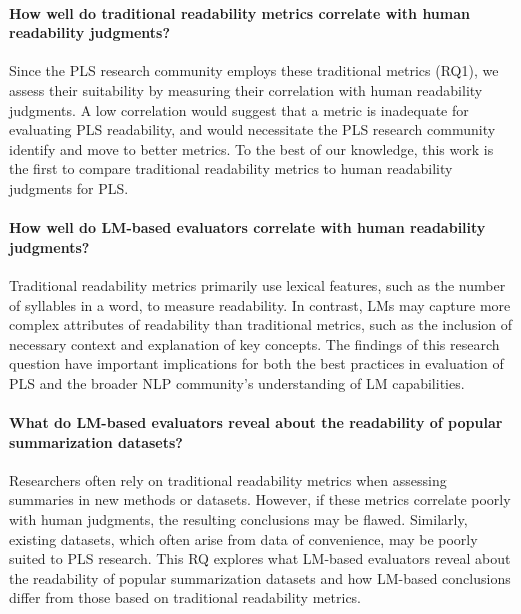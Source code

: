 \paragraph{{\rqtwo\label{rq2}}How well do traditional readability metrics correlate with human readability judgments?} Since the PLS research community employs these traditional metrics (RQ1), we assess their suitability by measuring their correlation with human readability judgments. A low correlation would suggest that a metric is inadequate for evaluating PLS readability, and would necessitate the PLS research community identify and move to better metrics. To the best of our knowledge, this work is the first to compare traditional readability metrics to human readability judgments for PLS.

\paragraph{{\rqthree\label{rq3}}How well do LM-based evaluators correlate with human readability judgments?} Traditional readability metrics primarily use lexical features, such as the number of syllables in a word, to measure readability. In contrast, LMs may capture more complex attributes of readability than traditional metrics, such as the inclusion of necessary context and explanation of key concepts. The findings of this research question have important implications for both the best practices in evaluation of PLS and the broader NLP community's understanding of LM capabilities.

\paragraph{{\rqfour\label{rq4}} What do LM-based evaluators reveal about the readability of popular summarization datasets?} Researchers often rely on traditional readability metrics when assessing summaries in new methods or datasets. However, if these metrics correlate poorly with human judgments, the resulting conclusions may be flawed. Similarly, existing datasets, which often arise from data of convenience, may be poorly suited to PLS research. This RQ explores what LM-based evaluators reveal about the readability of popular summarization datasets and how LM-based conclusions differ from those based on traditional readability metrics. 

